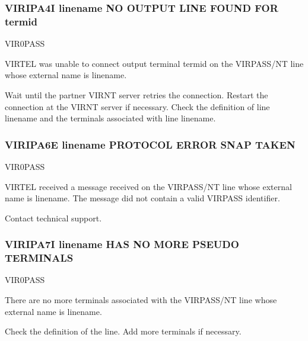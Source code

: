 \documentclass[letterpaper,10pt,english]{sphinxmanual}
\begin{document}
\subsubsection{VIRIPA4I linename NO OUTPUT LINE FOUND FOR termid}
\label{\detokenize{messages:viripa4i-linename-no-output-line-found-for-termid}}\begin{description}
\sphinxAtStartPar
VIR0PASS

\sphinxAtStartPar
VIRTEL was unable to connect output terminal termid on the VIRPASS/NT line whose external name is linename.

\sphinxAtStartPar
Wait until the partner VIRNT server retries the connection. Restart the connection at the VIRNT server if necessary. Check the definition of line linename and the terminals associated with line linename.

\end{description}


\subsubsection{VIRIPA6E linename PROTOCOL ERROR \sphinxhyphen{} SNAP TAKEN}
\label{\detokenize{messages:viripa6e-linename-protocol-error-snap-taken}}\begin{description}
\sphinxAtStartPar
VIR0PASS

\sphinxAtStartPar
VIRTEL received a message received on the VIRPASS/NT line whose external name is linename. The message did not contain a valid VIRPASS identifier.

\sphinxAtStartPar
Contact technical support.

\end{description}


\subsubsection{VIRIPA7I linename HAS NO MORE PSEUDO TERMINALS}
\label{\detokenize{messages:viripa7i-linename-has-no-more-pseudo-terminals}}\begin{description}
\sphinxAtStartPar
VIR0PASS

\sphinxAtStartPar
There are no more terminals associated with the VIRPASS/NT line whose external name is linename.

\sphinxAtStartPar
Check the definition of the line. Add more terminals if necessary.

\end{description}
\end{document}
